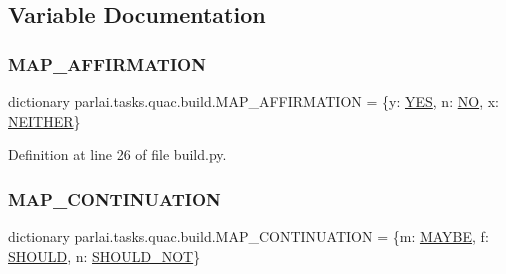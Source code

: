 \subsection{Variable Documentation}
\mbox{\label{namespaceparlai_1_1tasks_1_1quac_1_1build_ab20c3d8515482b46022a2dbd6b0065a3}} 
\subsubsection{\texorpdfstring{M\+A\+P\+\_\+\+A\+F\+F\+I\+R\+M\+A\+T\+I\+ON}{MAP\_AFFIRMATION}}
{\footnotesize\ttfamily dictionary parlai.\+tasks.\+quac.\+build.\+M\+A\+P\+\_\+\+A\+F\+F\+I\+R\+M\+A\+T\+I\+ON = \{\textquotesingle{}y\textquotesingle{}\+: \hyperlink{namespaceparlai_1_1tasks_1_1quac_1_1build_ae765b76a84d02581f82b38b996795052}{Y\+ES}, \textquotesingle{}n\textquotesingle{}\+: \hyperlink{namespaceparlai_1_1tasks_1_1quac_1_1build_a50beb08d880b27c076327f5a0a26d2e5}{NO}, \textquotesingle{}x\textquotesingle{}\+: \hyperlink{namespaceparlai_1_1tasks_1_1quac_1_1build_aea3d40b1bffbd55955c5d462803932c1}{N\+E\+I\+T\+H\+ER}\}}



Definition at line 26 of file build.\+py.

\mbox{\label{namespaceparlai_1_1tasks_1_1quac_1_1build_a4c0429a20d4b3f822b92a2897131ee2d}} 
\subsubsection{\texorpdfstring{M\+A\+P\+\_\+\+C\+O\+N\+T\+I\+N\+U\+A\+T\+I\+ON}{MAP\_CONTINUATION}}
{\footnotesize\ttfamily dictionary parlai.\+tasks.\+quac.\+build.\+M\+A\+P\+\_\+\+C\+O\+N\+T\+I\+N\+U\+A\+T\+I\+ON = \{\textquotesingle{}m\textquotesingle{}\+: \hyperlink{namespaceparlai_1_1tasks_1_1quac_1_1build_a0591761190bee9bc4e39f88d0f374e86}{M\+A\+Y\+BE}, \textquotesingle{}f\textquotesingle{}\+: \hyperlink{namespaceparlai_1_1tasks_1_1quac_1_1build_a5f8e1b371211c16c440b76b8ae3f3af6}{S\+H\+O\+U\+LD}, \textquotesingle{}n\textquotesingle{}\+: \hyperlink{namespaceparlai_1_1tasks_1_1quac_1_1build_af323f9b5375de6cea2bca8b24615a464}{S\+H\+O\+U\+L\+D\+\_\+\+N\+OT}\}}



